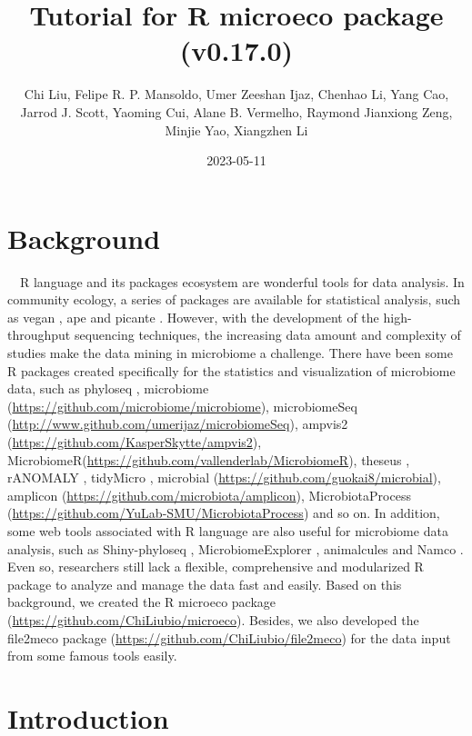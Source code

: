 \documentclass[
]{book}
\title{Tutorial for R microeco package (v0.17.0)}
\author{Chi Liu, Felipe R. P. Mansoldo, Umer Zeeshan Ijaz, Chenhao Li, Yang Cao, Jarrod J. Scott, Yaoming Cui, Alane B. Vermelho, Raymond Jianxiong Zeng, Minjie Yao, Xiangzhen Li}
\date{2023-05-11}
\begin{document}
\maketitle

{
\setcounter{tocdepth}{1}
\tableofcontents
}
\hypertarget{background}{%
\chapter{Background}\label{background}}

　R language \citep{R-base} and its packages ecosystem are wonderful tools for data analysis.
In community ecology, a series of packages are available for statistical analysis,
such as vegan \citep{Jari_vegan_2019}, ape \citep{Paradis_ape_2018} and picante \citep{Picante_Kembel_2010}.
However, with the development of the high-throughput sequencing techniques,
the increasing data amount and complexity of studies make the data mining in microbiome a challenge.
There have been some R packages created specifically for the statistics and visualization of microbiome data,
such as phyloseq \citep{Mcmurdie_phyloseq_2013},
microbiome (\url{https://github.com/microbiome/microbiome}), microbiomeSeq (\url{http://www.github.com/umerijaz/microbiomeSeq}),
ampvis2 (\url{https://github.com/KasperSkytte/ampvis2}), MicrobiomeR(\url{https://github.com/vallenderlab/MicrobiomeR}),
theseus \citep{Price_theseus_2018}, rANOMALY \citep{Theil_rANOMALY_2021},
tidyMicro \citep{Carpenter_tidyMicro_2021}, microbial (\url{https://github.com/guokai8/microbial}),
amplicon (\url{https://github.com/microbiota/amplicon}),
MicrobiotaProcess (\url{https://github.com/YuLab-SMU/MicrobiotaProcess})
and so on.
In addition, some web tools associated with R language are also useful for microbiome data analysis,
such as Shiny-phyloseq \citep{McMurdie_Shiny_2015}, MicrobiomeExplorer \citep{Reeder_MicrobiomeExplorer_2021},
animalcules \citep{Zhao_animalcules_2021} and Namco \citep{Dietrich_Namco_2022}.
Even so, researchers still lack a flexible, comprehensive and modularized R package to analyze and manage the data fast and easily.
Based on this background, we created the R microeco package \citep{Liu_microeco_2021} (\url{https://github.com/ChiLiubio/microeco}).
Besides, we also developed the file2meco package (\url{https://github.com/ChiLiubio/file2meco}) for the data input from some famous tools easily.

\hypertarget{intro}{%
\chapter{Introduction}\label{intro}}
\end{document}
